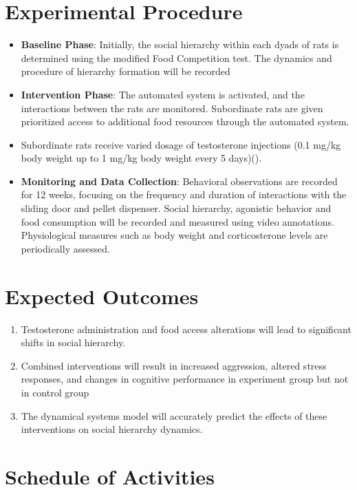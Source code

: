 \documentclass[english, a4paper, 11pt]{article}
\begin{document}
\section{Experimental Procedure}
\begin{itemize}
    \item \textbf{Baseline Phase}: Initially, the social hierarchy within each dyads of rats is determined using the modified Food Competition test. The dynamics and procedure of hierarchy formation will be recorded
    \item \textbf{Intervention Phase}: The automated system is activated, and the interactions between the rats are monitored. Subordinate rats are given prioritized access to additional food resources through the automated system.
    \item Subordinate rats receive varied dosage of testosterone injections (0.1 mg/kg body weight up to 1 mg/kg body weight every 5 days)(\cite{albertTestosteroneRemovalRats1986,wilsonSocialDominanceCastrate1971}).
    \item \textbf{Monitoring and Data Collection}: Behavioral observations are recorded for 12 weeks, focusing on the frequency and duration of interactions with the sliding door and pellet dispenser. Social hierarchy, agonistic behavior and food consumption will be recorded and measured using video annotations. Physiological measures such as body weight and corticosterone levels are periodically assessed.
\end{itemize}


\section{Expected Outcomes}
\begin{enumerate}
    \item Testosterone administration and food access alterations will lead to significant shifts in social hierarchy.
    \item Combined interventions will result in increased aggression, altered stress responses, and changes in cognitive performance in experiment group but not in control group
    \item The dynamical systems model will accurately predict the effects of these interventions on social hierarchy dynamics.
\end{enumerate}

\section{Schedule of Activities}
\end{document}
